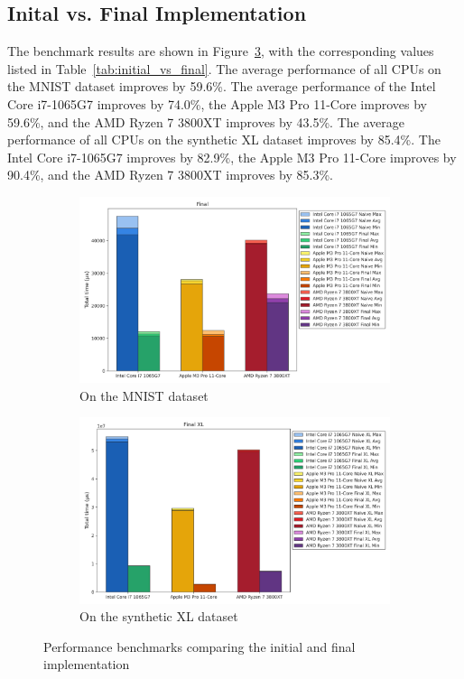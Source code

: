 \documentclass[modern,longauthor]{aastex7}
\begin{document}
\subsection{Inital vs. Final Implementation}\label{sec:inital-vs-final-implementation}
The benchmark results are shown in Figure~\ref{fig:initial_vs_final}, with the corresponding values listed in Table~\ref{tab:initial_vs_final}. The average performance of all CPUs on the MNIST dataset improves by 59.6\%. The average performance of the Intel Core i7-1065G7 improves by 74.0\%, the Apple M3 Pro 11-Core improves by 59.6\%, and the AMD Ryzen 7 3800XT improves by 43.5\%. The average performance of all CPUs on the synthetic XL dataset improves by 85.4\%. The Intel Core i7-1065G7 improves by 82.9\%, the Apple M3 Pro 11-Core improves by 90.4\%, and the AMD Ryzen 7 3800XT improves by 85.3\%.
\begin{figure}[htb!]
\centering
\begin{subfigure}{.5\textwidth}
  \centering
  \includegraphics[width=\linewidth]{Graphs/Final.png}
  \caption{On the MNIST dataset}
 \label{fig:initial_vs_final_mnist}
\end{subfigure}%
\begin{subfigure}{.5\textwidth}
  \centering
  \includegraphics[width=\linewidth]{Graphs/Final XL.png}
  \caption{On the synthetic XL dataset}
 \label{fig:initial_vs_final_xl}
\end{subfigure}
\caption{Performance benchmarks comparing the initial and final implementation}
\label{fig:initial_vs_final}
\end{figure}
\end{document}
